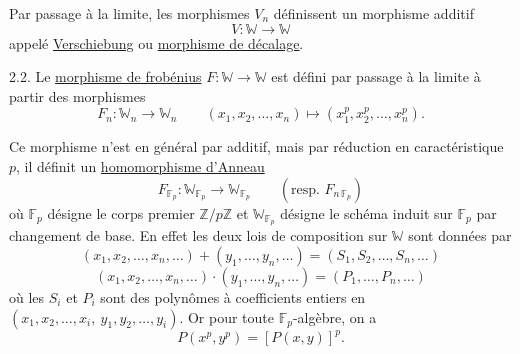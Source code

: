 Par passage à la limite, les morphismes $V_n$ définissent
un morphisme additif
\[ V\colon \mathbb{W} \to \mathbb{W} \]
appelé \uline{Verschiebung} ou \uline{morphisme de décalage}.

2.2. Le \uline{morphisme de frobénius} $F\colon \mathbb{W} \to \mathbb{W}$ est défini par passage
à la limite à partir des morphismes
\[ F_n\colon \mathbb{W}_n \to \mathbb{W}_n \qquad (x_1,x_2,\dots,x_n) \mapsto (x_1^p,x_2^p,\dots,x_n^p). \]

Ce morphisme n'est en général par additif, mais par réduction
en caractéristique $p$, il définit un \uline{homomorphisme d'Anneau}
\[ F_{\mathbb{F}_p} : \mathbb{W}_{\mathbb{F}_p} \to \mathbb{W}_{\mathbb{F}_p} \qquad (\text{resp. } F_{n\,\mathbb{F}_p}) \]
où $\mathbb{F}_p$ désigne le corps premier $\mathbb{Z}/p\mathbb{Z}$ et $\mathbb{W}_{\mathbb{F}_p}$ désigne le schéma
induit sur $\mathbb{F}_p$ par changement de base. En effet les deux lois de
composition sur $\mathbb{W}$ sont données par
\[ (x_1,x_2,\dots,x_n,\dots) + (y_1,\dots,y_n,\dots) = (S_1,S_2,\dots,S_n,\dots) \]
\[ (x_1,x_2,\dots,x_n,\dots)\cdot(y_1,\dots,y_n,\dots) = (P_1,\dots,P_n,\dots) \]
où les $S_i$ et $P_i$ sont des polynômes à coefficients entiers en
$(x_1,x_2,\dots,x_i,\ y_1,y_2,\dots,y_i)$. Or pour toute $\mathbb{F}_p$-algèbre, on a
\[ P(x^p,y^p) = [P(x,y)]^p. \]

